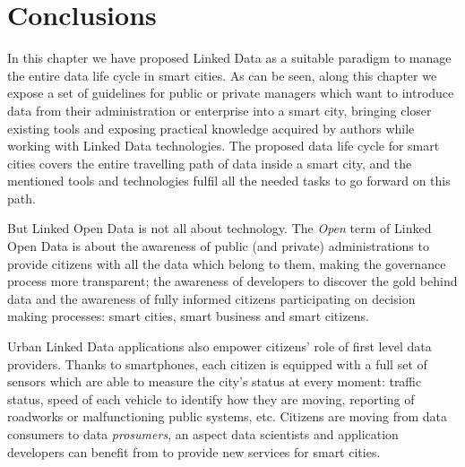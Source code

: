 \section{Conclusions}

In this chapter we have proposed Linked Data as a suitable paradigm to manage the entire data life cycle in smart cities. As can be seen, along this chapter we expose a set of guidelines for public or private managers which want to introduce data from their administration or enterprise into a smart city, bringing closer existing tools and exposing practical knowledge acquired by authors while working with Linked Data technologies. The proposed data life cycle for smart cities covers the entire travelling path of data inside a smart city, and the mentioned tools and technologies fulfil all the needed tasks to go forward on this path.

But Linked Open Data is not all about technology. The \textit{Open} term of Linked Open Data is about the awareness of public (and private) administrations to provide citizens with all the data which belong to them, making the governance process more transparent; the awareness of developers to discover the gold behind data and the awareness of fully informed citizens participating on decision making processes: smart cities, smart business and smart citizens.

Urban Linked Data applications also empower citizens' role of first level data providers. Thanks to smartphones, each citizen is equipped with a full set of sensors which are able to measure the city's status at every moment: traffic status, speed of each vehicle to identify how they are moving, reporting of roadworks or malfunctioning public systems, etc. Citizens are moving from data consumers to data \textit{prosumers}, an aspect data scientists and application developers can benefit from to provide new services for smart cities.
